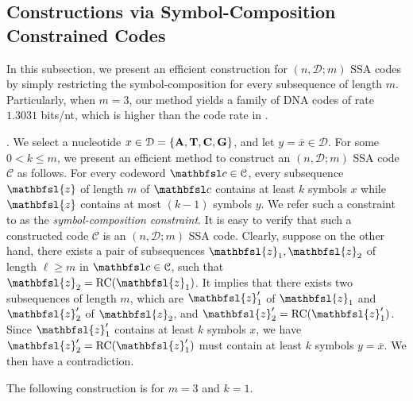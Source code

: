 \documentclass[conference]{IEEEtran}
\theoremstyle{plain}
\theoremstyle{definition}
\newtheorem{remark}{Remark}
\newcommand{\hm}[1]{{\color{magenta}(HM: #1)}}
\newcommand{\C}{{\mathcal C}}
\newcommand{\D}{{\mathcal D}}
\newcommand{\bc}{{\mathbfsl c}}
\newcommand{\bz}{{\mathbfsl{z}}}
\renewcommand{\ge}{\geqslant}
\renewcommand{\le}{\leqslant}
\begin{document}


\subsection{Constructions via Symbol-Composition Constrained Codes}
In this subsection, we present an efficient construction for $(n,\D;m)$ SSA codes 
by simply restricting the symbol-composition for every subsequence of length $m$. Particularly, when $m = 3$, our method yields a family of DNA codes of rate $1.3031$ bits/nt, which is higher than the code rate in \cite{K:2021}. 
\vspace{0.05in}

.
We select a nucleotide $x \in \D=\{{\bf A}, {\bf T}, {\bf C}, {\bf G}\}$, and let $y=\overline{x}\in \D$. For some $0<k\le m$, we present an efficient method to construct an $(n,\D;m)$ SSA code $\C$ as follows. For every codeword $\bc\in\C$, every subsequence $\bz$ of length $m$ of $\bc$ contains at least $k$ symbols $x$ while $\bz$ contains at most $(k-1)$ symbols $y$. We refer such a constraint to as the {\em symbol-composition constraint}. 
It is easy to verify that such a constructed code $\C$ is an $(n,\D;m)$ SSA code. Clearly, suppose on the other hand, there exists a pair of subsequences $\bz_1, \bz_2$ of length $\ell\ge m$ in $\bc\in \C$, such that $\bz_2={\rm RC}(\bz_1)$. It implies that there exists two subsequences of length $m$, which are $\bz_1'$ of $\bz_1$ and $\bz_2'$ of $\bz_2$, and $\bz_2'={\rm RC}(\bz_1')$. Since $\bz_1'$ contains at least $k$ symbols $x$, we have $\bz_2'={\rm RC}(\bz_1')$ must contain at least $k$ symbols $y=\overline{x}$. We then have a contradiction.
\vspace{0.05in}

The following construction is for $m=3$ and $k=1$.
\end{document}
